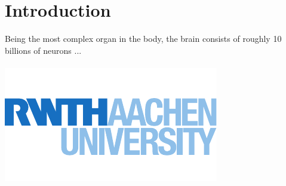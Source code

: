 \chapter{Introduction}
Being the most complex organ in the body, the brain consists of roughly 10 billions of neurons\cite{mueller2000} ...
\\
\\
\includegraphics{figures/rwth}